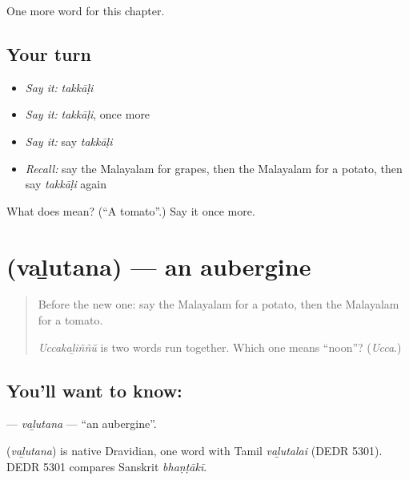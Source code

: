 \begin{grammarlens}[title={What you've built}]
One more word for this chapter.
\end{grammarlens}

\subsection*{Your turn}
\begin{itemize}
\raggedright
  \item \emph{Say it:} \emph{takkāḷi}
  \item \emph{Say it:} \emph{takkāḷi}, once more
  \item \emph{Say it:} say \emph{takkāḷi}
  \item \emph{Recall:} say the Malayalam for grapes, then the Malayalam for a potato, then say \emph{takkāḷi} again
\end{itemize}

\begin{tcolorbox}[breakable,colback=teal!4,colframe=teal!35!black,title={Before you move on}]
What does  mean? (\textquotedblleft{}A tomato\textquotedblright{}.) Say it once more.
\end{tcolorbox}
\section[\texorpdfstring{\ml{വഴുതന} (vaḻutana)}{വഴുതന (vaḻutana)}]{ (vaḻutana) — an aubergine}

\label{lesson:ML-C150-valutana}



\begin{quote}
Before the new one: say the Malayalam for a potato, then the Malayalam for a tomato.

\emph{Uccakaḻiññŭ} is two words run together. Which one means \textquotedblleft{}noon\textquotedblright{}? (\emph{Ucca}.)
\end{quote}

\subsection*{You'll want to know: }
\textbf{} — \emph{vaḻutana} — \textquotedblleft{}an aubergine\textquotedblright{}.

\begin{cousinweb}
\textbf{} (\emph{vaḻutana}) is native Dravidian, one word with Tamil \emph{vaḻutalai} (DEDR 5301). DEDR 5301 compares Sanskrit \emph{bhaṇṭākī}.
\end{cousinweb}

